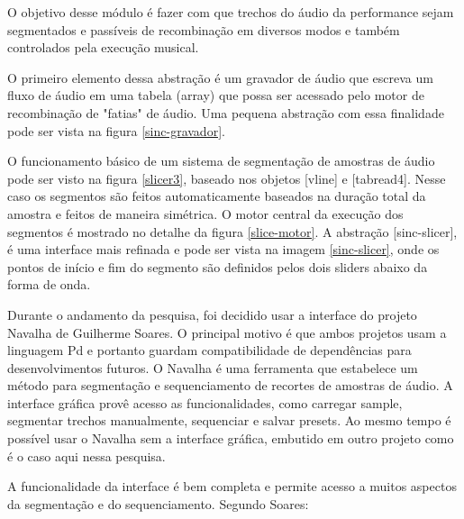 \documentclass{ppgmus}
\begin{document}
O objetivo desse módulo é fazer com que trechos do áudio da performance sejam segmentados e 
passíveis de recombinação em diversos modos e também controlados pela execução musical.

O primeiro elemento dessa abstração é um gravador de áudio que escreva um fluxo
de áudio em uma tabela (array) que possa ser acessado pelo motor de recombinação de "fatias" de áudio.
Uma pequena abstração com essa finalidade pode ser vista na figura \ref{sinc-gravador}.

O funcionamento básico de um sistema de segmentação de amostras de áudio pode ser visto na figura \ref{slicer3},
baseado nos objetos [vline\texttildelow] e [tabread4\texttildelow]. Nesse caso os segmentos são feitos
automaticamente baseados na duração total da amostra e feitos de maneira simétrica.
O motor central da execução dos segmentos é mostrado no detalhe da figura \ref{slice-motor}.
A abstração [sinc-slicer], é uma interface mais refinada e pode ser vista na imagem \ref{sinc-slicer}, 
onde os pontos de início e fim do segmento são definidos pelos dois sliders abaixo da forma de onda.

Durante o andamento da pesquisa, foi decidido usar a interface do projeto Navalha de Guilherme Soares.
O principal motivo é que ambos projetos usam a linguagem Pd e portanto guardam compatibilidade de dependências 
para desenvolvimentos futuros.
O Navalha é uma ferramenta que estabelece
um método para segmentação e sequenciamento de recortes de amostras de áudio. A interface gráfica
provê acesso as funcionalidades, como carregar sample, segmentar trechos manualmente, sequenciar e 
salvar presets. Ao mesmo tempo é possível usar o Navalha sem a interface gráfica, embutido em outro
projeto como é o caso aqui nessa pesquisa.

A funcionalidade da interface é bem completa e permite acesso a muitos aspectos da segmentação e do
sequenciamento. Segundo Soares:
\end{document}
